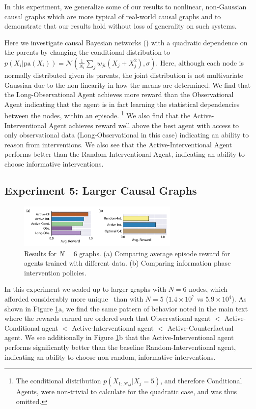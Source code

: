 In this experiment, we generalize some of our results to nonlinear, non-Gaussian causal graphs which are more typical of real-world causal graphs and to demonstrate that our results hold without loss of generality on such systems. 

Here we investigate causal Bayesian networks (\CBNs) with a quadratic dependence on the parents by changing the conditional distribution to $p(X_{i}|\textrm{pa}(X_{i})) = \mathcal{N}(\frac{1}{N_{i}} \sum_{j} w_{ji}(X_{j} + X_{j}^2), \sigma)$. Here, although each node is normally distributed given its parents, the joint distribution is not multivariate Gaussian due to the non-linearity in how the means are determined. We find that the Long-Observational Agent achieves more reward than the Observational Agent indicating that the agent is in fact learning the statistical dependencies between the nodes, within an episode.
\footnote{The conditional distribution $p(X_{1:N\setminus j }|X_j=5)$, and therefore Conditional Agents, were non-trivial to calculate for the quadratic case, and was thus omitted.}
We also find that the Active-Interventional Agent achieves reward well above the best agent with access to only observational data (Long-Observational in this case) indicating an ability to reason from interventions. We also see that the Active-Interventional Agent performs better than the Random-Interventional Agent, indicating an ability to choose informative interventions.


\subsection{Experiment 5: Larger Causal Graphs}

\begin{figure}[ht!]
\centering
\includegraphics[width=0.7\textwidth]{figures/N6_results_active.pdf} 
\caption{Results for $N=6$ graphs. (a) Comparing average episode reward for agents trained with different data. (b) Comparing information phase intervention policies. }
\label{fig:N6_results}
\end{figure}
In this experiment we scaled up to larger graphs with $N=6$ nodes, which afforded considerably more unique \CBNs~than with $N=5$ ($1.4\times10^7$ vs $5.9\times10^4$). As shown in Figure \ref{fig:N6_results}a, we find the same pattern of behavior noted in the main text where the rewards earned are ordered such that Observational agent $<$ Active-Conditional agent $<$ Active-Interventional agent $<$ Active-Counterfactual agent. We see additionally in Figure \ref{fig:N6_results}b that the Active-Interventional agent performs significantly better than the baseline Random-Interventional agent, indicating an ability to choose non-random, informative interventions.

\newpage


